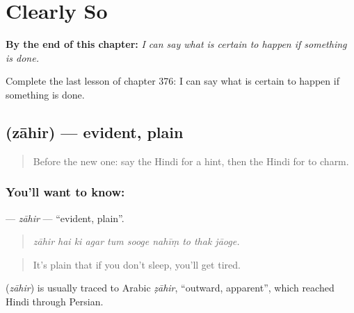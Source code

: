 
\chapter{Clearly So}
\label{ch:hi-clearly-so}

\begin{chapteropening}
\textbf{By the end of this chapter:} \emph{I can say what is certain to happen if something is done.}

Complete the last lesson of chapter 376: I can say what is certain to happen if something is done.
\end{chapteropening}

\section[\texorpdfstring{\hi{ज़ाहिर} (zāhir)}{ज़ाहिर (zāhir)}]{ (zāhir) — evident, plain}

\label{lesson:HI-C376-zahir}



\begin{quote}
Before the new one: say the Hindi for a hint, then the Hindi for to charm.
\end{quote}

\subsection*{You'll want to know: }
\textbf{} — \emph{zāhir} — \textquotedblleft{}evident, plain\textquotedblright{}.

\begin{quote}
         
\end{quote}

\begin{quote}
\emph{zāhir hai ki agar tum sooge nahīṃ to thak jāoge.}
\end{quote}

\begin{quote}
It's plain that if you don't sleep, you'll get tired.
\end{quote}

\begin{cousinweb}
\textbf{} (\emph{zāhir}) is usually traced to Arabic \emph{ẓāhir}, \textquotedblleft{}outward, apparent\textquotedblright{}, which reached Hindi through Persian.
\end{cousinweb}

